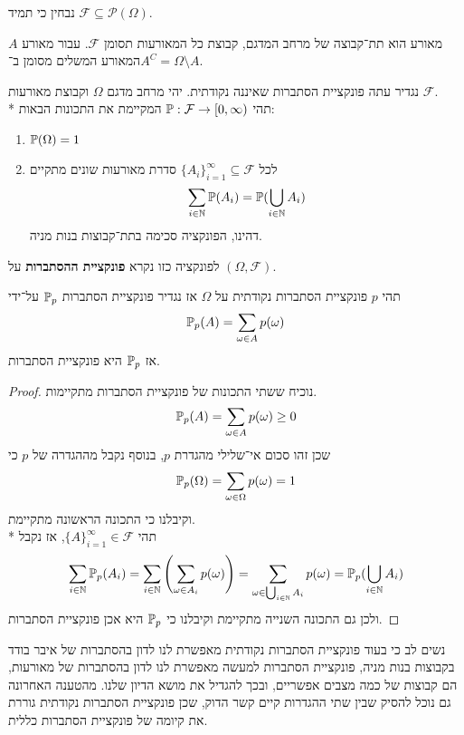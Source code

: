 \begin{remark}
	נבחין כי תמיד $\mathcal{F} \subseteq \mathcal{P}(\Omega)$.
\end{remark}
\begin{definition}[מאורע]
	מאורע הוא תת־קבוצה של מרחב המדגם, קבוצת כל המאורעות תסומן $\mathcal{F}$.
	עבור מאורע $A$ המאורע המשלים מסומן ב־$A^C = \Omega \setminus A$.
\end{definition}
\begin{definition}
	נגדיר עתה פונקציית הסתברות שאיננה נקודתית.
	יהי מרחב מדגם $\Omega$ וקבוצת מאורעות $\mathcal{F}$. \\*
	תהי $\mathbb{P} : \mathcal{F} \to [0, \infty)$ המקיימת את התכונות הבאות:
	\begin{enumerate}
		\item $\mathbb{P}(\Omega) = 1$
		\item לכל ${\{A_i\}}_{i = 1}^\infty \subseteq \mathcal{F}$ סדרת מאורעות שונים מתקיים
			\[
				\sum_{i \in \mathbb{N}} \mathbb{P}(A_i) = \mathbb{P}(\bigcup_{i \in \mathbb{N}} A_i)
			\]
			דהינו, הפונקציה סכימה בתת־קבוצות בנות מניה.
	\end{enumerate}
	לפונקציה כזו נקרא \textbf{פונקציית ההסתברות} על $(\Omega, \mathcal{F})$.
\end{definition}
\begin{proposition}
	תהי $p$ פונקציית הסתברות נקודתית על $\Omega$ אז נגדיר פונקציית הסתברות $\mathbb{P}_p$ על־ידי
	\[
		\mathbb{P}_p(A) = \sum_{\omega \in A} p(\omega)
	\]
	אז $\mathbb{P}_p$ היא פונקציית הסתברות.
\end{proposition}
\begin{proof}
	נוכיח ששתי התכונות של פונקציית הסתברות מתקיימות.
	\[
		\mathbb{P}_p(A) = \sum_{\omega \in A} p(\omega) \ge 0
	\]
	שכן זהו סכום אי־שלילי מהגדרת $p$,
	בנוסף נקבל מההגדרה של $p$ כי
	\[
		\mathbb{P}_p(\Omega) = \sum_{\omega \in \Omega} p(\omega) = 1
	\]
	וקיבלנו כי התכונה הראשונה מתקיימת. \\*
	תהי ${\{A\}}_{i = 1}^\infty \in \mathcal{F}$, אז נקבל
	\[
		\sum_{i \in \mathbb{N}} \mathbb{P}_p(A_i) = \sum_{i \in \mathbb{N}} \left( \sum_{\omega \in A_i} p(\omega) \right) = \sum_{\omega \in \bigcup_{i \in \mathbb{N}} A_i} p(\omega) = \mathbb{P}_p(\bigcup_{i \in \mathbb{N}} A_i)
	\]
	ולכן גם התכונה השנייה מתקיימת וקיבלנו כי $\mathbb{P}_p$ היא אכן פונקציית הסתברות.
\end{proof}
נשים לב כי בעוד פונקציית הסתברות נקודתית מאפשרת לנו לדון בהסתברות של איבר בודד בקבוצות בנות מניה, פונקציית הסתברות למעשה מאפשרת לנו לדון בהסתברות של מאורעות, הם קבוצות של כמה מצבים אפשריים, ובכך להגדיל את מושא הדיון שלנו.
מהטענה האחרונה גם נוכל להסיק שבין שתי ההגדרות קיים קשר הדוק, שכן פונקציית הסתברות נקודתית גוררת את קיומה של פונקציית הסתברות כללית.

